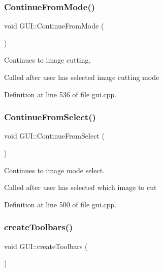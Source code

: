 \mbox{\label{classGUI_a3547730e0fae81b59fcb19d00a370782}} 
\subsubsection{\texorpdfstring{Continue\+From\+Mode()}{ContinueFromMode()}}
{\footnotesize\ttfamily void G\+U\+I\+::\+Continue\+From\+Mode (\begin{DoxyParamCaption}{ }\end{DoxyParamCaption})}



Continues to image cutting. 

Called after user has selected image cutting mode 

Definition at line 536 of file gui.\+cpp.

\mbox{\label{classGUI_a0cddf3859f457495040857f4868f32e3}} 
\subsubsection{\texorpdfstring{Continue\+From\+Select()}{ContinueFromSelect()}}
{\footnotesize\ttfamily void G\+U\+I\+::\+Continue\+From\+Select (\begin{DoxyParamCaption}{ }\end{DoxyParamCaption})}



Continues to image mode select. 

Called after user has selected which image to cut 

Definition at line 500 of file gui.\+cpp.

\mbox{\label{classGUI_a26cdc4a989f3637301f0afb9cc5e23b0}} 
\subsubsection{\texorpdfstring{create\+Toolbars()}{createToolbars()}}
{\footnotesize\ttfamily void G\+U\+I\+::create\+Toolbars (\begin{DoxyParamCaption}{ }\end{DoxyParamCaption})}



